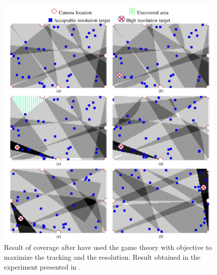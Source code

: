 \begin{figure}[t!]
\center
{}
   \includegraphics[width=\linewidth]{img/CoverageFrom18.png}
  \caption{ Result of coverage after have used the game theory with objective to maximize the tracking and the resolution. Result obtained in the experiment presented in \cite{18*ding2012}.}\label{fig:CoverageFrom18}\endminipage\hfill
\end{figure}
	
